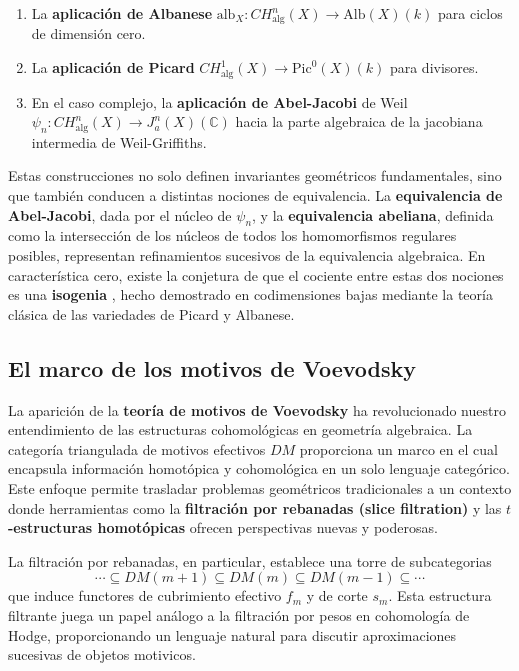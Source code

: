 \documentclass[10pt]{amsart}
\theoremstyle{definition}
\theoremstyle{remark}
\theoremstyle{definition}
\begin{document}
\begin{enumerate}
    \item La \textbf{aplicación de Albanese} $\mathrm{alb}_X:CH^{n}_{\mathrm{alg}}(X) \to \mathrm{Alb}(X)(k)$ para ciclos de dimensión cero.
    \item La \textbf{aplicación de Picard} $CH^{1}_{\mathrm{alg}}(X) \to \mathrm{Pic}^0(X)(k)$ para divisores.
    \item En el caso complejo, la \textbf{aplicación de Abel-Jacobi} de Weil $\psi_n:CH^{n}_{\mathrm{alg}}(X) \to J_a^n(X)(\mathbb{C})$ hacia la parte algebraica de la jacobiana intermedia de Weil-Griffiths.
\end{enumerate}

Estas construcciones no solo definen invariantes geométricos fundamentales, sino que también conducen a distintas nociones de equivalencia. La \textbf{equivalencia de Abel-Jacobi}, dada por el núcleo de $\psi_n$, y la \textbf{equivalencia abeliana}, definida como la intersección de los núcleos de todos los homomorfismos regulares posibles, representan refinamientos sucesivos de la equivalencia algebraica. En característica cero, existe la conjetura de que el cociente entre estas dos nociones es una \textbf{isogenia} \cite{Kle71}, hecho demostrado en codimensiones bajas mediante la teoría clásica de las variedades de Picard y Albanese.

\subsection{El marco de los motivos de Voevodsky}

La aparición de la \textbf{teoría de motivos de Voevodsky} \cite{Voe00a,Voe00b} ha revolucionado nuestro entendimiento de las estructuras cohomológicas en geometría algebraica. La categoría triangulada de motivos efectivos $DM$ proporciona un marco en el cual encapsula información homotópica y  cohomológica en un solo lenguaje categórico. Este enfoque permite trasladar problemas geométricos tradicionales a un contexto donde herramientas como la \textbf{filtración por rebanadas (slice filtration)} y las \textbf{$t$-estructuras homotópicas} ofrecen perspectivas nuevas y poderosas.

La filtración por rebanadas, en particular, establece una torre de subcategorias
\[
\cdots \subseteq DM(m+1) \subseteq DM(m) \subseteq DM(m-1) \subseteq \cdots
\]
que induce functores de cubrimiento efectivo $f_m$ y de corte $s_m$. Esta estructura filtrante juega un papel análogo a la filtración por pesos en cohomología de Hodge, proporcionando un lenguaje natural para discutir aproximaciones sucesivas de objetos motivicos.
\end{document}
